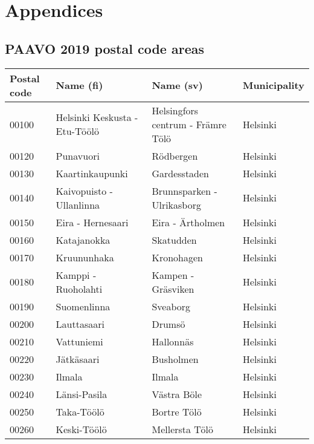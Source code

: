 \section{Appendices}
\subsection{PAAVO 2019 postal code areas}
\justify

\begin{longtable}{llll}
    \hline
    Postal code & Name (fi) & Name (sv) & Municipality \\ [0.5ex]
    \hline\hline
    \endhead %
    00100 & Helsinki Keskusta - Etu-Töölö & Helsingfors centrum - Främre Tölö & Helsinki \\ [0.5 ex] \hline
    00120 & Punavuori & Rödbergen & Helsinki \\ [0.25ex] \hline
    00130 & Kaartinkaupunki & Gardesstaden & Helsinki \\ [0.25ex] \hline
    00140 & Kaivopuisto - Ullanlinna & Brunnsparken - Ulrikasborg & Helsinki \\ [0.25ex] \hline
    00150 & Eira - Hernesaari & Eira - Ärtholmen & Helsinki \\ [0.25ex] \hline
    00160 & Katajanokka & Skatudden & Helsinki \\ [0.25ex] \hline
    00170 & Kruununhaka & Kronohagen & Helsinki \\ [0.25ex] \hline
    00180 & Kamppi - Ruoholahti & Kampen - Gräsviken & Helsinki  \\ [0.25ex] \hline
    00190 & Suomenlinna & Sveaborg & Helsinki \\ [0.25ex] \hline
    00200 & Lauttasaari & Drumsö & Helsinki \\ [0.25ex] \hline
    00210 & Vattuniemi & Hallonnäs & Helsinki \\ [0.25ex] \hline
    00220 & Jätkäsaari & Busholmen & Helsinki \\ [0.25ex] \hline
    00230 & Ilmala & Ilmala & Helsinki \\ [0.25ex] \hline
    00240 & Länsi-Pasila & Västra Böle & Helsinki \\ [0.25ex] \hline
    00250 & Taka-Töölö & Bortre Tölö & Helsinki \\ [0.25ex] \hline
    00260 & Keski-Töölö & Mellersta Tölö & Helsinki \\ [0.25ex] \hline

\end{longtable}
